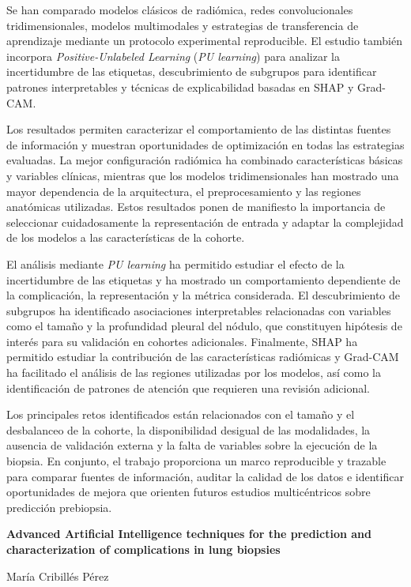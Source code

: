 Se han comparado modelos clásicos de radiómica, redes convolucionales tridimensionales, modelos multimodales y estrategias de transferencia de aprendizaje mediante un protocolo experimental reproducible. El estudio también incorpora \textit{Positive-Unlabeled Learning} (\textit{PU learning}) para analizar la incertidumbre de las etiquetas, descubrimiento de subgrupos para identificar patrones interpretables y técnicas de explicabilidad basadas en SHAP y Grad-CAM.

Los resultados permiten caracterizar el comportamiento de las distintas fuentes de información y muestran oportunidades de optimización en todas las estrategias evaluadas. La mejor configuración radiómica ha combinado características básicas y variables clínicas, mientras que los modelos tridimensionales han mostrado una mayor dependencia de la arquitectura, el preprocesamiento y las regiones anatómicas utilizadas. Estos resultados ponen de manifiesto la importancia de seleccionar cuidadosamente la representación de entrada y adaptar la complejidad de los modelos a las características de la cohorte.

El análisis mediante \textit{PU learning} ha permitido estudiar el efecto de la incertidumbre de las etiquetas y ha mostrado un comportamiento dependiente de la complicación, la representación y la métrica considerada. El descubrimiento de subgrupos ha identificado asociaciones interpretables relacionadas con variables como el tamaño y la profundidad pleural del nódulo, que constituyen hipótesis de interés para su validación en cohortes adicionales. Finalmente, SHAP ha permitido estudiar la contribución de las características radiómicas y Grad-CAM ha facilitado el análisis de las regiones utilizadas por los modelos, así como la identificación de patrones de atención que requieren una revisión adicional.

Los principales retos identificados están relacionados con el tamaño y el desbalanceo de la cohorte, la disponibilidad desigual de las modalidades, la ausencia de validación externa y la falta de variables sobre la ejecución de la biopsia. En conjunto, el trabajo proporciona un marco reproducible y trazable para comparar fuentes de información, auditar la calidad de los datos e identificar oportunidades de mejora que orienten futuros estudios multicéntricos sobre predicción prebiopsia.

\cleardoublepage


\thispagestyle{empty}


\begin{center}
{\large\bfseries Advanced Artificial Intelligence techniques for the prediction and characterization of complications in lung biopsies}\\
\end{center}
\begin{center}
María Cribillés Pérez\\
\end{center}

